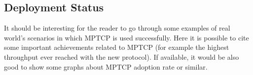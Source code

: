 \subsection{Deployment Status}
It should be interesting for the reader to go through some examples of real world's scenarios in which MPTCP is used successfully. Here it is possible to cite some important achievements related to MPTCP (for example the highest throughput ever reached with the new protocol).
If available, it would be also good to show some graphs about MPTCP adoption rate or similar.